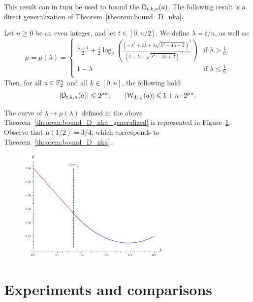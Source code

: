\documentclass{llncs}
\begin{document}
This result can in turn be used to bound the $\mathsf{D}_{t,k,n}(a)$.
The following result is a direct generalization of Theorem~\ref{theorem:bound_D_nka}.

\begin{theorem}\label{theorem:bound_D_nka_generalized}
    Let $n\geq 0$ be an even integer, and let $t\in[0,n/2]$. We define $\lambda=t/n$, as well as:
    \[
        \mu=\mu(\lambda)=
        \begin{cases}
            \frac{\lambda+1}{2}+\frac12\log_2\left(\frac{\left(-\lambda^2+2\lambda+\lambda\sqrt{\lambda^2-4\lambda+2}\right)^\lambda}{\left(1-\lambda+\sqrt{\lambda^2-4\lambda+2}\right)^{2\lambda-1}}\right)&\text{if $\lambda>\frac 16$,}\\
            1-\lambda&\text{if $\lambda\leq\frac 16$.}\\
        \end{cases}
    \]
    Then, for all $a\in\mathbb{F}_2^n$ and all $k\in[0,n]$, the following hold:
    \[
        |\mathsf{D}_{t,k,n}(a)|\leqslant 2^{\mu n},\qquad  |\mathcal W_{d_{t,n}}(a)|\leqslant 1+n\cdot 2^{\mu n}.
    \]
\end{theorem}

The curve of $\lambda\mapsto\mu(\lambda)$ defined in the above Theorem~\ref{theorem:bound_D_nka_generalized} is represented in Figure~\ref{fig:curve_exponents_lambda_mu}. Observe that $\mu(1/2)=3/4$, which corresponds to Theorem~\ref{theorem:bound_D_nka}.

\begin{figure}
	\centering
	\includegraphics[width=7.5cm]{curve_exponents_lambda_mu.pdf}
    \vspace{-5mm}
	\label{fig:curve_exponents_lambda_mu}
\end{figure}

\section{Experiments and comparisons}\label{sec:expAndComp}
\end{document}
